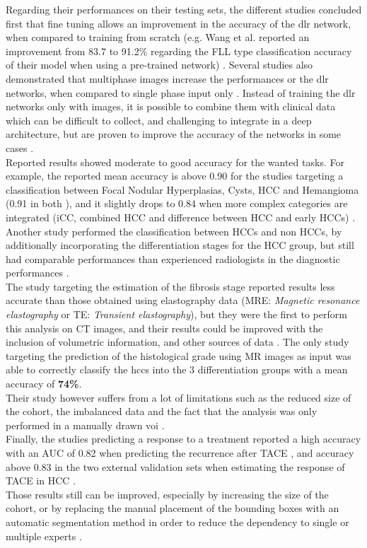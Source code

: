 Regarding their performances on their testing sets, the different
studies concluded first that fine tuning allows an improvement in the
accuracy of the \ac{dlr} network, when compared to training from
scratch (e.g. Wang et al. reported an improvement from 83.7 to 91.2\%
regarding the FLL type classification accuracy of their model when using a
pre-trained network) \cite{Wang2018,Yamada2019}. Several studies also demonstrated that multiphase images
increase the performances or the \ac{dlr} networks, when compared to
single phase input only \cite{Yasaka2018}. Instead of
training the \ac{dlr} networks only with images, it is possible to
combine them with clinical data which can be difficult to collect, and
challenging to integrate in a deep architecture, but are proven to
improve the accuracy of the networks in some cases \cite{WANG2019}.\\
Reported results showed moderate to good accuracy for the wanted tasks.
For example, the reported mean accuracy is above 0.90 for the studies
targeting a classification between Focal Nodular Hyperplasias, Cysts,
HCC and Hemangioma (0.91 in both \cite{Liang2018,Wang2018}), and it slightly drops to 0.84 when more complex categories
are integrated (iCC, combined HCC and difference between HCC and early
HCCs) \cite{Yasaka2018a}. Another study performed the
classification between HCCs and non HCCs, by additionally incorporating
the differentiation stages for the HCC group, but still had comparable
performances than experienced radiologists in the diagnostic
performances \cite{Yamada2019}.\\
The study targeting the estimation of the fibrosis stage reported
results less accurate than those obtained using elastography data
(MRE: \emph{Magnetic resonance elastography} or TE: \emph{Transient
elastography}), but they were the first to perform this analysis on CT
images, and their results could be improved with the inclusion of
volumetric information, and other sources of data \cite{Yasaka2018a}.
The only study targeting the prediction of the histological grade using MR images as input was able to correctly classify the \ac{hcc}s into the 3 differentiation groups with a mean accuracy of \textbf{74\%}.\\
Their study however suffers from a lot of limitations such as the
reduced size of the cohort, the imbalanced data and the fact that the
analysis was only performed in a manually drawn \ac{voi} \cite{Yang2019}.\\

Finally, the studies predicting a response to a treatment reported a
high accuracy with an AUC of 0.82 when predicting the recurrence after
TACE \cite{WANG2019}, and accuracy above 0.83 in the two
external validation sets when estimating the response of TACE in HCC
\cite{Peng2020}.\\
Those results still can be improved, especially by increasing the size
of the cohort, or by replacing the manual placement of the bounding
boxes with an automatic segmentation method in order to reduce the
dependency to single or multiple experts \cite{Yasaka2018a,Peng2020}.

